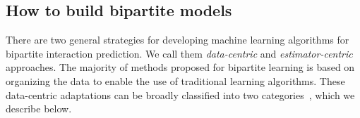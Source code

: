 \subsection{How to build bipartite models}

There are two general strategies for developing machine learning algorithms for bipartite interaction prediction. We call them \emph{data-centric} and \emph{estimator-centric} approaches.
%
The majority of methods proposed for bipartite learning is based on organizing the data to enable the use of traditional learning algorithms.
These data-centric adaptations can be broadly classified into two categories~\cite{schrynemackers2015classifying,pliakos2018global,pliakos2020drugtarget}, which we describe below.

